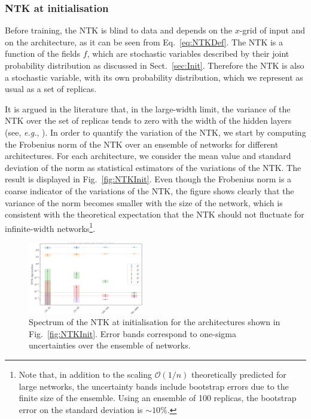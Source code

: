 \subsubsection{NTK at initialisation}
\label{sec:NTKAtInit}

Before training, the NTK is blind to data and depends on the $x$-grid of input
and on the architecture, as it can be seen from Eq.~\eqref{eq:NTKDef}. The NTK
is a function of the fields $f$, which are stochastic variables described by
their joint probability distribution as discussed in Sect.~\ref{sec:Init}.
Therefore the NTK is also a stochastic variable, with its own probability
distribution, which we represent as usual as a set of replicas. 

It is argued in the literature that, in the large-width limit, the variance of
the NTK over the set of replicas tends to zero with the width of the hidden
layers (see, \textit{e.g.}, \cite{Roberts:2021fes}). In order to quantify the
variation of the NTK, we start by computing the Frobenius norm of the NTK over
an ensemble of networks for different architectures. For each architecture, we
consider the mean value and standard deviation of the norm as statistical
estimators of the variations of the NTK. The result is displayed in
Fig.~\ref{fig:NTKInit}. Even though the Frobenius norm is a coarse indicator of
the variations of the NTK, the figure shows clearly that the variance of the
norm becomes smaller with the size of the network, which is consistent with the
theoretical expectation that the NTK should not fluctuate for infinite-width
networks\footnote{Note that, in addition to the scaling $\mathcal{O}(1/n)$
theoretically predicted for large networks, the uncertainty bands include
bootstrap errors due to the finite size of the ensemble. Using an ensemble of
100 replicas, the bootstrap error on the standard deviation is $\sim 10\%$.}.

\begin{figure}[t]
  \centering
  \includegraphics[width=0.45\textwidth]{figs/section_3/ntk_initialization_arch.pdf}
  \caption{Spectrum of the NTK at initialisation for the architectures shown in
  Fig.~\ref{fig:NTKInit}. Error bands correspond to one-sigma uncertainties over
  the ensemble of networks.}
  \label{fig:NTKSpectrum}
\end{figure}

